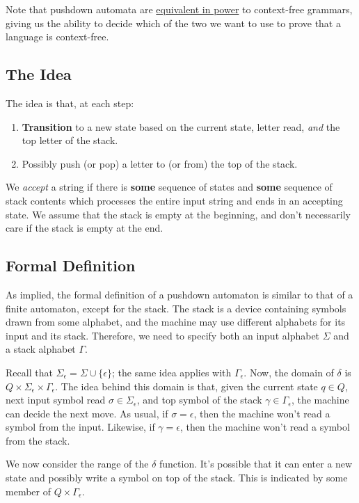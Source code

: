 \documentclass[letterpaper]{article}
\begin{document}
\bigskip 

Note that pushdown automata are \underline{equivalent in power} to context-free grammars, giving us the ability to decide which of the two we want to use to prove that a language is context-free. 


\subsection{The Idea}
The idea is that, at each step: 
\begin{enumerate}
    \item \textbf{Transition} to a new state based on the current state, letter read, \emph{and} the top letter of the stack. 
    \item Possibly push (or pop) a letter to (or from) the top of the stack. 
\end{enumerate}
We \emph{accept} a string if there is \textbf{some} sequence of states and \textbf{some} sequence of stack contents which processes the entire input string and ends in an accepting state. We assume that the stack is empty at the beginning, and don't necessarily care if the stack is empty at the end.

\subsection{Formal Definition}
As implied, the formal definition of a pushdown automaton is similar to that of a finite automaton, except for the stack. The stack is a device containing symbols drawn from some alphabet, and the machine may use different alphabets for its input and its stack. Therefore, we need to specify both an input alphabet $\Sigma$ and a stack alphabet $\Gamma$. 

\bigskip 

Recall that $\Sigma_{\epsilon} = \Sigma \cup \{\epsilon\}$; the same idea applies with $\Gamma_{\epsilon}$. Now, the domain of $\delta$ is $Q \times \Sigma_{\epsilon} \times \Gamma_{\epsilon}$. The idea behind this domain is that, given the current state $q \in Q$, next input symbol read $\sigma \in \Sigma_{\epsilon}$, and top symbol of the stack $\gamma \in \Gamma_{\epsilon}$, the machine can decide the next move. As usual, if $\sigma = \epsilon$, then the machine won't read a symbol from the input. Likewise, if $\gamma = \epsilon$, then the machine won't read a symbol from the stack.  

\bigskip 

We now consider the range of the $\delta$ function. It's possible that it can enter a new state and possibly write a symbol on top of the stack. This is indicated by some member of $Q \times \Gamma_{\epsilon}$. 
\end{document}
